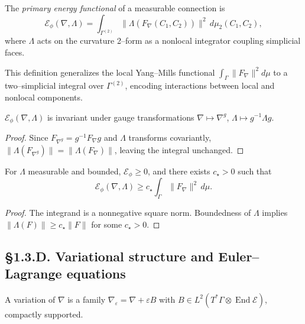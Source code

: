\begin{definition}\label{def:1.3.energy}
The \emph{primary energy functional} of a measurable connection is
\[
\mathcal{E}_\phi(\nabla,\Lambda)
  =\int_{\Gamma^{(2)}} \|\Lambda(F_\nabla(C_1,C_2))\|^2\, d\mu_2(C_1,C_2),
\]
where $\Lambda$ acts on the curvature 2–form as a nonlocal integrator coupling simplicial faces.
\end{definition}

\begin{remark}
This definition generalizes the local Yang–Mills functional
$\int_\Gamma \|F_\nabla\|^2 d\mu$
to a two–simplicial integral over $\Gamma^{(2)}$, encoding interactions between local and nonlocal components.
\end{remark}

\begin{theorem}\label{thm:1.3.inv}
$\mathcal{E}_\phi(\nabla,\Lambda)$ is invariant under gauge transformations $\nabla\mapsto\nabla^g$, $\Lambda\mapsto g^{-1}\Lambda g$.
\end{theorem}

\begin{proof}
Since $F_{\nabla^g}=g^{-1}F_\nabla g$ and $\Lambda$ transforms covariantly, $\|\Lambda(F_{\nabla^g})\|=\|\Lambda(F_\nabla)\|$, leaving the integral unchanged.
\end{proof}

\begin{lemma}\label{lem:1.3.coerc}
For $\Lambda$ measurable and bounded, $\mathcal{E}_\phi\ge0$, and there exists $c_\star>0$ such that
\[
\mathcal{E}_\phi(\nabla,\Lambda)
  \ge c_\star \int_\Gamma \|F_\nabla\|^2\,d\mu.
\]
\end{lemma}

\begin{proof}
The integrand is a nonnegative square norm. 
Boundedness of $\Lambda$ implies $\|\Lambda(F)\|\ge c_\star\|F\|$ for some $c_\star>0$.
\end{proof}

\subsection*{§1.3.D. Variational structure and Euler–Lagrange equations}

\begin{definition}
A variation of $\nabla$ is a family $\nabla_\varepsilon=\nabla+\varepsilon B$ with $B\in L^2(T^\ast\Gamma\otimes\operatorname{End}\mathcal E)$, compactly supported.
\end{definition}

